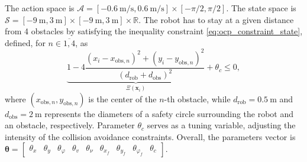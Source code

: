 \documentclass[letterpaper, 10pt, conference]{ieeeconf}
\begin{document}
The action space is $\mathcal{A} = [\SI{-0.6}{\meter\per\second}, \SI{0.6}{\meter\per\second}]\times[-\pi/2,\pi/2]$.
The state space is $\mathcal{S} = [\SI{-9}{\meter}, \SI{3}{\meter}]\times[\SI{-9}{\meter}, \SI{3}{\meter}]\times\mathbb{R}$.
The robot has to stay at a given distance from 4 obstacles by satisfying the inequality constraint \eqref{eq:ocp_constraint_state}, defined, for $n\in\overline{1,4}$, as
\begin{equation} \label{eq:obstacle_constraint}
	\underbrace{1 - 4\frac{(x_i - x_{\text{obs},n })^2 + (y_i - y_{\text{obs},n})^2} {(d_{\text{rob}} + d_{\text{obs}})^2}}_{\Xi(\mathbf{x}_i)} + \theta_c \leq 0,
\end{equation}
where $(x_{\text{obs},n}, y_{\text{obs},n})$ is the center of the $n$-th obstacle, while $d_{\text{rob}} = \SI{0.5}{\meter}$ and $d_{\text{obs}} = \SI{2}{\meter}$ represents the diameters of a safety circle surrounding  the robot and an obstacle, respectively.
Parameter $\theta_c$ serves as a tuning variable, adjusting the intensity of the collision avoidance constraints.
Overall, the parameters vector is $\boldsymbol{\theta} = \begin{bmatrix}\theta_x & \theta_y & \theta_{\varphi} & \theta_v & \theta_{\nu} & \theta_{x_f} & \theta_{y_f} & \theta_{\varphi_f} & \theta_c\end{bmatrix}$.
\end{document}
